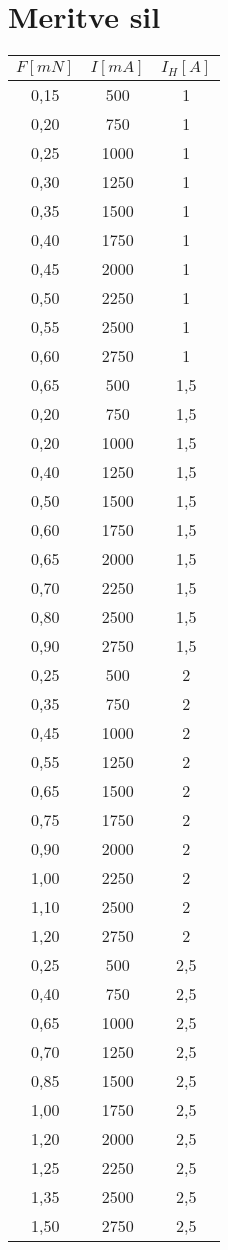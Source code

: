 \documentclass[a4paper]{report}
\begin{document}
\section*{Meritve sil}
\begin{center}
\begin{tabular}{ |c|c|c| } 
 \hline
 $F[mN]$ & $I[mA]$ & $I_H[A]$\\
 \hline \hline 
 0,15  & 500   & 1 \\
    0,20  & 750   & 1 \\
    0,25  & 1000  & 1 \\
    0,30  & 1250  & 1 \\
    0,35  & 1500  & 1 \\
    0,40  & 1750  & 1 \\
    0,45  & 2000  & 1 \\
    0,50  & 2250  & 1 \\
    0,55  & 2500  & 1 \\
    0,60  & 2750  & 1 \\
    \hline
    0,65  & 500   & 1,5 \\
    0,20  & 750   & 1,5 \\
    0,20  & 1000  & 1,5 \\
    0,40  & 1250  & 1,5 \\
    0,50  & 1500  & 1,5 \\
    0,60  & 1750  & 1,5 \\
    0,65  & 2000  & 1,5 \\
    0,70  & 2250  & 1,5 \\
    0,80  & 2500  & 1,5 \\
    0,90  & 2750  & 1,5 \\
    \hline
    0,25  & 500   & 2 \\
    0,35  & 750   & 2 \\
    0,45  & 1000  & 2 \\
    0,55  & 1250  & 2 \\
    0,65  & 1500  & 2 \\
    0,75  & 1750  & 2 \\
    0,90  & 2000  & 2 \\
    1,00  & 2250  & 2 \\
    1,10  & 2500  & 2 \\
    1,20  & 2750  & 2 \\
    \hline
    0,25  & 500   & 2,5 \\
    0,40  & 750   & 2,5 \\
    0,65  & 1000  & 2,5 \\
    0,70  & 1250  & 2,5 \\
    0,85  & 1500  & 2,5 \\
    1,00  & 1750  & 2,5 \\
    1,20  & 2000  & 2,5 \\
    1,25  & 2250  & 2,5 \\
    1,35  & 2500  & 2,5 \\
    1,50  & 2750  & 2,5 \\
    
 \hline
\end{tabular}
\end{center}
\pagebreak
\end{document}
